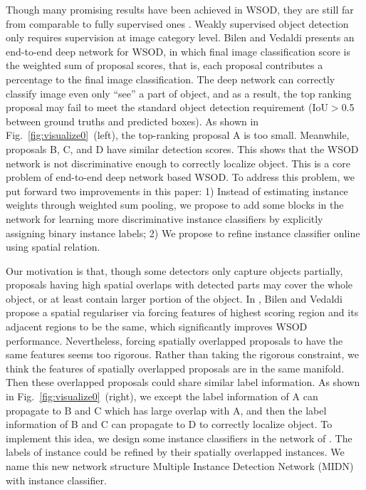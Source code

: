 \documentclass[10pt,twocolumn,letterpaper]{article}
\begin{document}
Though many promising results have been achieved in WSOD, they are still far from comparable to fully supervised ones \cite{Ref:Girshick2015,Ref:Girshick2016,Ref:Ren2015}.
Weakly supervised object detection only requires supervision at image category level. 
Bilen and Vedaldi \cite{Ref:Bilen2016} presents an end-to-end deep network for WSOD, in which final image classification score is the weighted sum of proposal scores, that is, each proposal contributes a percentage to the final image classification.
The deep network can correctly classify image even only ``see'' a part of object, and as a result, the top ranking proposal may fail to meet the standard object detection requirement (IoU$>$0.5 between ground truths and predicted boxes).
As shown in Fig.~\ref{fig:visualize0}~(left), the top-ranking proposal A is too small.
Meanwhile, proposals B, C, and D have similar detection scores.
This shows that the WSOD network is not discriminative enough to correctly localize object.
This is a core problem of end-to-end deep network based WSOD.
To address this problem, we put forward two improvements in this paper:
1) Instead of estimating instance weights through weighted sum pooling, we propose to add some blocks in the network for learning more discriminative instance classifiers by explicitly assigning binary instance labels;
2) We propose to refine instance classifier online using spatial relation.

Our motivation is that, though some detectors only capture objects partially, proposals having high spatial overlaps with detected parts may cover the whole object, or at least contain larger portion of the object.
In \cite{Ref:Bilen2016}, Bilen and Vedaldi propose a spatial regulariser via forcing features of highest scoring region and its adjacent regions to be the same, which significantly improves WSOD performance.
Nevertheless, forcing spatially overlapped proposals to have the same features seems too rigorous.
Rather than taking the rigorous constraint, we think the features of spatially overlapped proposals are in the same manifold.
Then these overlapped proposals could share similar label information.
As shown in Fig.~\ref{fig:visualize0}~(right), we except the label information of A can propagate to B and C which has large overlap with A, and then the label information of B and C can propagate to D to correctly localize object. 
To implement this idea, we design some instance classifiers in the network of \cite{Ref:Bilen2016}. 
The labels of instance could be refined by their spatially overlapped instances.
We name this new network structure Multiple Instance Detection Network (MIDN) with instance classifier.
\end{document}
